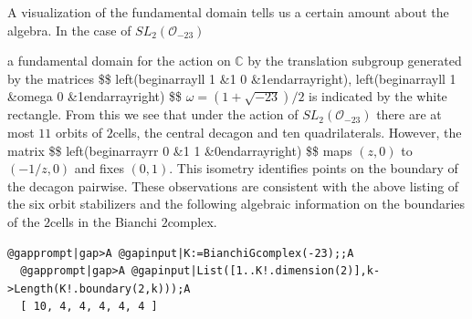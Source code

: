 \documentclass[a4paper,11pt]{report}
\begin{document}
{{{\begin{Verbatim}[commandchars=@|A,fontsize=\small,frame=single,label=Example]
\end{Verbatim}
 A visualization of the fundamental domain tells us a certain amount about the
algebra. In the case of $SL_2({\mathcal O}_{-23})$ 

  

 a fundamental domain for the action on $\mathbb C$ by the translation subgroup generated by the matrices \$\$
\texttt{}left(\texttt{}begin\texttt{}array\texttt{}\texttt{}ll\texttt{}
1 \&1\texttt{}\texttt{} 0
\&1\texttt{}end\texttt{}array\texttt{}\texttt{}right),
\texttt{}left(\texttt{}begin\texttt{}array\texttt{}\texttt{}ll\texttt{}
1 \&\texttt{}omega\texttt{}\texttt{} 0
\&1\texttt{}end\texttt{}array\texttt{}\texttt{}right)
\$\$ $\omega = (1+\sqrt{-23})/2$ is indicated by the white rectangle. From this we see that under the action of $SL_2({\mathcal O}_{-23})$ there are at most $11$ orbits of $2$\texttt{}cells, the central decagon and ten quadrilaterals.
However, the matrix \$\$
\texttt{}left(\texttt{}begin\texttt{}array\texttt{}\texttt{}rr\texttt{}
0 \&\texttt{}1\texttt{}\texttt{} 1
\&0\texttt{}end\texttt{}array\texttt{}\texttt{}right)
\$\$ maps $(z,0)$ to $(-1/z,0)$ and fixes $(0,1)$. This isometry identifies points on the boundary of the decagon pairwise.
These observations are consistent with the above listing of the six orbit
stabilizers and the following algebraic information on the boundaries of the $2$\texttt{}cells in the Bianchi $2$\texttt{}complex. 
\begin{Verbatim}[commandchars=@|A,fontsize=\small,frame=single,label=Example]
  @gapprompt|gap>A @gapinput|K:=BianchiGcomplex(-23);;A
  @gapprompt|gap>A @gapinput|List([1..K!.dimension(2)],k->Length(K!.boundary(2,k)));A
  [ 10, 4, 4, 4, 4, 4 ]
  
\end{Verbatim}
 }

 }

 
}
\end{document}
